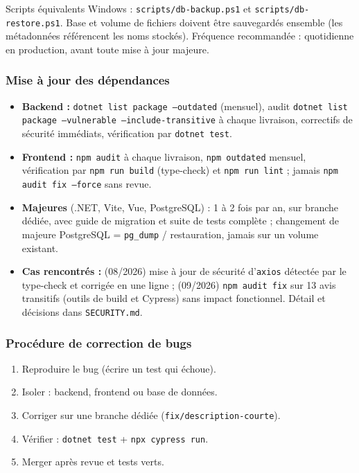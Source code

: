 \documentclass[12pt,a4paper]{article}
\begin{document}
Scripts \'equivalents Windows : \texttt{scripts/db-backup.ps1} et \texttt{scripts/db-restore.ps1}. Base et volume de fichiers doivent \^etre sauvegard\'es ensemble (les m\'etadonn\'ees r\'ef\'erencent les noms stock\'es). Fr\'equence recommand\'ee : quotidienne en production, avant toute mise \`a jour majeure.

\subsubsection{Mise \`a jour des d\'ependances}

\begin{itemize}[nosep]
  \item \textbf{Backend :} \texttt{dotnet list package --outdated} (mensuel), audit \texttt{dotnet list package --vulnerable --include-transitive} \`a chaque livraison, correctifs de s\'ecurit\'e imm\'ediats, v\'erification par \texttt{dotnet test}.
  \item \textbf{Frontend :} \texttt{npm audit} \`a chaque livraison, \texttt{npm outdated} mensuel, v\'erification par \texttt{npm run build} (type-check) et \texttt{npm run lint} ; jamais \texttt{npm audit fix --force} sans revue.
  \item \textbf{Majeures} (.NET, Vite, Vue, PostgreSQL) : 1 \`a 2 fois par an, sur branche d\'edi\'ee, avec guide de migration et suite de tests compl\`ete ; changement de majeure PostgreSQL = \texttt{pg\_dump} / restauration, jamais sur un volume existant.
  \item \textbf{Cas rencontr\'es :} (08/2026) mise \`a jour de s\'ecurit\'e d'\texttt{axios} d\'etect\'ee par le type-check et corrig\'ee en une ligne ; (09/2026) \texttt{npm audit fix} sur 13 avis transitifs (outils de build et Cypress) sans impact fonctionnel. D\'etail et d\'ecisions dans \texttt{SECURITY.md}.
\end{itemize}

\subsubsection{Proc\'edure de correction de bugs}

\begin{enumerate}[nosep]
  \item Reproduire le bug (\'ecrire un test qui \'echoue).
  \item Isoler : backend, frontend ou base de donn\'ees.
  \item Corriger sur une branche d\'edi\'ee (\texttt{fix/description-courte}).
  \item V\'erifier : \texttt{dotnet test} + \texttt{npx cypress run}.
  \item Merger apr\`es revue et tests verts.
\end{enumerate}
\end{document}
